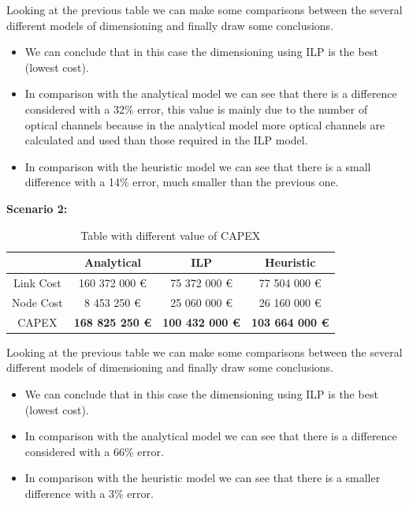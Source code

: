 \vspace{11pt}
Looking at the previous table we can make some comparisons between the several different models of dimensioning and finally draw some conclusions.

\begin{itemize}
  \item We can conclude that in this case the dimensioning using ILP is the best (lowest cost).
  \item In comparison with the analytical model we can see that there is a difference considered with a 32\% error, this value is mainly due to the number of optical channels because in the analytical model more optical channels are calculated and used than those required in the ILP model.
  \item In comparison with the heuristic model we can see that there is a small difference with a 14\% error, much smaller than the previous one.
\end{itemize}

\vspace{11pt}
\textbf{Scenario 2:}\\

\begin{table}[h!]
\centering
\begin{tabular}{| c | c | c | c |}
 \hline
   & Analytical & ILP & Heuristic \\
 \hline\hline
 Link Cost & 160 372 000 \euro & 75 372 000 \euro & 77 504 000 \euro \\
 Node Cost & 8 453 250 \euro & 25 060 000 \euro & 26 160 000 \euro \\
 CAPEX & \textbf{168 825 250 \euro} & \textbf{100 432 000 \euro} & \textbf{103 664 000 \euro} \\
 \hline
\end{tabular}
\caption{Table with different value of CAPEX }
\label{table_comparative_opaque_sur_ref_2}
\end{table}

\vspace{11pt}
Looking at the previous table we can make some comparisons between the several different models of dimensioning and finally draw some conclusions.

\begin{itemize}
  \item We can conclude that in this case the dimensioning using ILP is the best (lowest cost).
  \item In comparison with the analytical model we can see that there is a difference considered with a 66\% error.
  \item In comparison with the heuristic model we can see that there is a smaller difference with a 3\% error.
\end{itemize}

